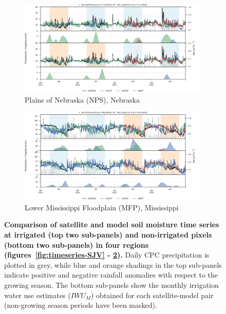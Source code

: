 \documentclass[hess, manuscript]{copernicus}
\begin{document}
\begin{figure}\ContinuedFloat
   \centering
   \begin{subfigure}[t]{0.7\textwidth}
       \centering
       \includegraphics[width=\textwidth]{figures/results/Nebraska_plains}
       \caption{Plains of Nebraska (NPS), Nebraska}
       \label{fig:timeseries-NPS}
   \end{subfigure}
   \hfill
   \begin{subfigure}[t]{0.7\textwidth}
       \centering
       \includegraphics[width=\textwidth]{figures/results/Mississippi_Flood_Plain}
       \caption{Lower Mississippi Floodplain (MFP), Mississippi}
       \label{fig:timeseries-MFP}
   \end{subfigure}
   \hfill
   \caption{\textbf{Comparison of satellite and model soil moisture time series at irrigated (top two sub-panels) and non-irrigated pixels (bottom two sub-panels) in four regions (figures~\ref{fig:timeseries-SJV} - \ref{fig:timeseries-MFP}).} Daily CPC precipitation is plotted in grey, while blue and orange shadings in the top sub-panels indicate positive and negative rainfall anomalies with respect to the growing season. The bottom sub-panels show the monthly irrigation water use estimates ($IWU_{M}$) obtained for each satellite-model pair (non-growing season periods have been masked).}
   \label{fig:timeseries}
\end{figure}
\end{document}
